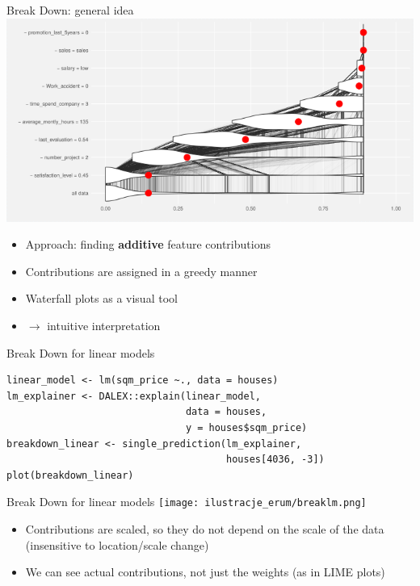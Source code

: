 \documentclass[xcolor={dvipsnames}]{beamer}
\begin{document}
\begin{frame}{Break Down: general idea}
	\includegraphics[scale=0.45]{ilustracje_erum/breakdown_intuition.png}
	\begin{itemize}
		\item Approach: finding \textbf{additive} feature contributions
		
		\item Contributions are assigned in a greedy manner
		
		\item Waterfall plots as a visual tool
		
		\item $\rightarrow$ intuitive interpretation
	\end{itemize}
\end{frame}

\begin{frame}[fragile]{Break Down for linear models}
	\begin{lstlisting}
linear_model <- lm(sqm_price ~., data = houses)
lm_explainer <- DALEX::explain(linear_model, 
		                       data = houses, 
		                       y = houses$sqm_price)
breakdown_linear <- single_prediction(lm_explainer, 
		                              houses[4036, -3])
plot(breakdown_linear)
	\end{lstlisting}
\end{frame}

\begin{frame}{Break Down for linear models}
	\centering
	\texttt{[image: ilustracje\_erum/breaklm.png]}
	\begin{itemize}
		\item Contributions are scaled, so they do not depend on the scale of the data (insensitive to location/scale change)
		\item We can see actual contributions, not just the weights (as in LIME plots)
	\end{itemize}
\end{frame}
\end{document}

